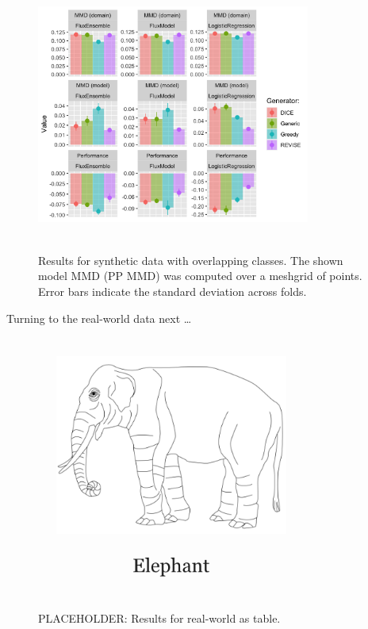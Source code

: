 \documentclass[
  conference]{IEEEtran}
\begin{document}
\begin{figure}

{\centering \includegraphics[width=9cm,height=9cm]{www/synthetic_results.png}

}

\caption{\label{fig-syn}Results for synthetic data with overlapping
classes. The shown model MMD (PP MMD) was computed over a meshgrid of
points. Error bars indicate the standard deviation across folds.}

\end{figure}

Turning to the real-world data next \ldots{}

\begin{figure}

{\centering \includegraphics[width=9cm,height=9cm]{www/placeholder.png}

}

\caption{\label{fig-real}PLACEHOLDER: Results for real-world as table.}

\end{figure}
\end{document}
